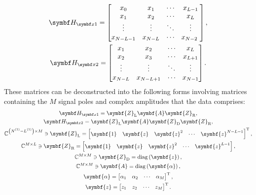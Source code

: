 \begin{subequations}
   \begin{gather}
        \Hxone =
        \begin{bmatrix}
            x_0 & x_1 & \cdots & x_{L-1} \\
            x_{1} & x_{2} & \cdots & x_{L} \\
            \vdots & \vdots & \ddots & \vdots\\
            x_{N-L-1} & x_{N-L} & \cdots & x_{N-2}\
        \end{bmatrix}, \\
        \Hxtwo =
        \begin{bmatrix}
            x_{1} & x_{2} & \cdots & x_{L} \\
            x_{2} & x_{3} & \cdots & x_{L+1} \\
            \vdots & \vdots & \ddots & \vdots\\
            x_{N-L} & x_{N-L+1} & \cdots & x_{N-1}\\
        \end{bmatrix}.
   \end{gather}
\end{subequations}
These matrices can be deconstructed into the following forms involving matrices
containing the $M$ signal poles and complex amplitudes that the data comprises:
\begin{subequations}
   \begin{gather}
       \Hxone = \symbf{Z}_{\text{L}} \symbf{A} \symbf{Z}_{\text{R}},\\
       \Hxtwo = \symbf{Z}_{\text{L}} \symbf{A} \symbf{Z}_{\text{D}} \symbf{Z}_{\text{R}},\\
       \mathbb{C}^{\left(\None - \Lone\right) \times M} \ni
       \symbf{Z}_{\text{L}} =
       \begin{bmatrix}
           \symbf{1} &
           \symbf{z} &
           \symbf{z}^2 &
           \cdots &
           \symbf{z}^{N-L-1}
        \end{bmatrix}\T,\\
        \mathbb{C}^{M \times L} \ni
        \symbf{Z}_{\text{R}} =
           \begin{bmatrix}
               \symbf{1} & \symbf{z} & {\symbf{z}}^{2} & \cdots & {\symbf{z}}^{L-1}
           \end{bmatrix} ,\\
        \mathbb{C}^{M \times M} \ni
        \symbf{Z}_{\text{D}} = \diag\left(\symbf{z}\right), \label{eq:ZD}\\
        \mathbb{C}^{M \times M} \ni
        \symbf{A} = \diag\left(\symbf{\alpha}\right),\label{eq:A}\\
        \symbf{\alpha} =
        \begin{bmatrix}
            \alpha_1 & \alpha_2 & \cdots & \alpha_M
        \end{bmatrix}\T,\\
        \symbf{z} =
        \begin{bmatrix}
            z_1 & z_2 & \cdots & z_M
        \end{bmatrix}\T.
   \end{gather}
    \label{eq:HX-decomp}
\end{subequations}
